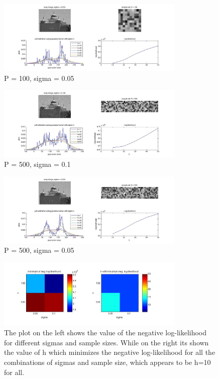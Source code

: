 \documentclass[]{article}
\begin{document}
\begin{figure}[ht]
	\centering
		\includegraphics[width=0.8\textwidth]{plot100_005.jpg}
		\caption{P = 100, sigma = 0.05}
	\label{sg:fig:plot100_005}
\end{figure}

\begin{figure}[ht]
	\centering
		\includegraphics[width=0.8\textwidth]{plot500_01.jpg}
		\caption{P = 500, sigma = 0.1}
	\label{sg:fig:plot500_01}
\end{figure}

\begin{figure}[ht]
	\centering
		\includegraphics[width=0.8\textwidth]{plot500_005.jpg}
		\caption{P = 500, sigma = 0.05}
	\label{sg:fig:plot500_005}
\end{figure}

\begin{figure}[ht]
	\centering
		\includegraphics[width=0.8\textwidth]{best_log.jpg}
	\caption{The plot on the left shows the value of the negative log-likelihood 
	for different sigmas and sample sizes. While on the right its shown the value 
	of h which minimizes the negative log-likelihood for all the combinations of 
	sigmas and sample size, which appears to be h=10 for all.}
	\label{sg:fig:best_log}
\end{figure}
\end{document}
